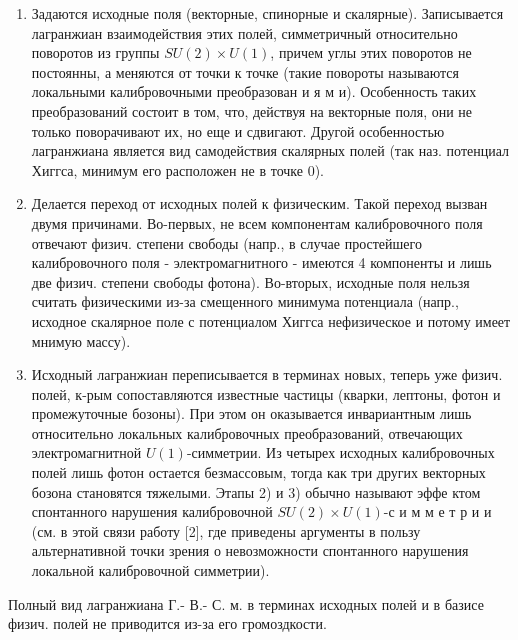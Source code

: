 \documentclass[10pt]{article}
\begin{document}
\begin{enumerate}

  \item Задаются исходные поля (векторные, спинорные и скалярные). Записывается лагранжиан взаимодействия этих полей, симметричный относительно поворотов из группы $S U(2) \times U(1)$, причем углы этих поворотов не постоянны, а меняются от точки к точке (такие повороты называются локальными калибровочными преобразован и я м и). Особенность таких преобразований состоит в том, что, действуя на векторные поля, они не только поворачивают их, но еще и сдвигают. Другой особенностью лагранжиана является вид самодействия скалярных полей (так наз. потенциал Хиггса, минимум его расположен не в точке 0).



  \item Делается переход от исходных полей к физическим. Такой переход вызван двумя причинами. Во-первых, не всем компонентам калибровочного поля отвечают физич. степени свободы (напр., в случае простейшего калибровочного поля - электромагнитного - имеются 4 компоненты и лишь две физич. степени свободы фотона). Во-вторых, исходные поля нельзя считать физическими из-за смещенного минимума потенциала (напр., исходное скалярное поле с потенциалом Хиггса нефизическое и потому имеет мнимую массу).



  \item Исходный лагранжиан переписывается в терминах новых, теперь уже физич. полей, к-рым сопоставляются известные частицы (кварки, лептоны, фотон и промежуточные бозоны). При этом он оказывается инвариантным лишь относительно локальных калибровочных преобразований, отвечающих электромагнитной $U(1)$-симметрии. Из четырех исходных калибровочных полей лишь фотон остается безмассовым, тогда как три других векторных бозона становятся тяжелыми. Этапы 2) и 3) обычно называют эффе ктом спонтанного нарушения калибровочной $S U(2) \times U(1)$-с и м м е т р и и (см. в этой связи работу [2], где приведены аргументы в пользу альтернативной точки зрения о невозможности спонтанного нарушения локальной калибровочной симметрии).



\end{enumerate}



Полный вид лагранжиана Г.- В.- С. м. в терминах исходных полей и в базисе физич. полей не приводится из-за его громоздкости.
\end{document}
